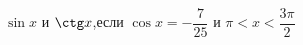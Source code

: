\begin{ex}[type=calculate_expression]
	\begin{condition}
		\( \sin x \) и \( \ctg x \),\quad если \( \cos x=-\dfrac{7}{25} \) и \( \pi < x < \dfrac{3\pi}{2} \)
	\end{condition}
\end{ex}